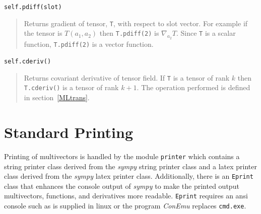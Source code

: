 \documentclass[12pt]{report}
\newcommand{\lp}{\left (}
\newcommand{\rp}{\right )}
\newcommand{\f}[2]{{#1}\lp {#2} \rp}
\newcommand{\T}[1]{\texttt{#1}}
\begin{document}
\T{self.pdiff(slot)}
\begin{quote}
    Returns gradient of tensor, \T{T}, with respect to slot vector.  For example if the tensor is $\f{T}{a_{1},a_{2}}$ then
    \T{T.pdiff(2)} is $\nabla_{a_{2}}T$.  Since \T{T} is a scalar function, \T{T.pdiff(2)} is a vector function.
\end{quote}

\T{self.cderiv()}
\begin{quote}
    Returns covariant derivative of tensor field. If \T{T} is a tensor of rank $k$ then \T{T.cderiv()} is a tensor of rank $k+1$.
    The operation performed is defined in section~\ref{MLtrans}.
\end{quote}

\section{Standard Printing}\label{stdprint}

Printing of multivectors is handled by the module \T{printer} which contains
a string printer class derived from the \emph{sympy} string printer class and a latex
printer class derived from the \emph{sympy} latex printer class.  Additionally, there
is an \T{Eprint} class that enhances the console output of \emph{sympy} to make
the printed output multivectors, functions, and derivatives more readable.
\T{Eprint} requires an ansi console such as is supplied in linux or the
program \emph{ConEmu} replaces \T{cmd.exe}.
\end{document}
